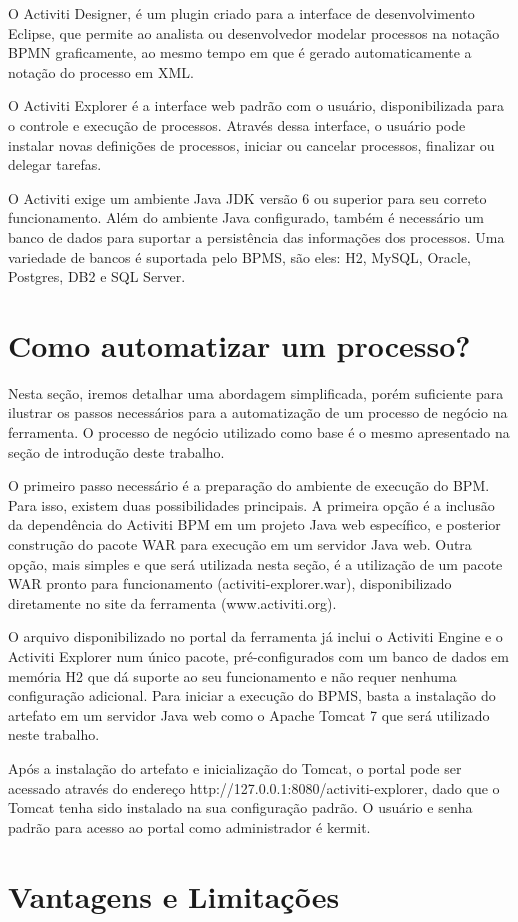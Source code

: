 O Activiti Designer, é um plugin criado para a interface de desenvolvimento Eclipse, que permite ao analista ou desenvolvedor modelar processos na notação BPMN graficamente, ao mesmo tempo em que é gerado automaticamente a notação do processo em XML.

O Activiti Explorer é a interface web padrão com o usuário, disponibilizada para o controle e execução de processos. Através dessa interface, o usuário pode instalar novas definições de processos, iniciar ou cancelar processos, finalizar ou delegar tarefas.

O Activiti exige um ambiente Java JDK versão 6 ou superior para seu correto funcionamento. Além do ambiente Java configurado, também é necessário um banco de dados para suportar a persistência das informações dos processos. Uma variedade de bancos é suportada pelo BPMS, são eles: H2, MySQL, Oracle, Postgres, DB2 e SQL Server.

\section{Como automatizar um processo?}\label{sec:activiti-automatizar_processo}

Nesta seção, iremos detalhar uma abordagem simplificada, porém suficiente para ilustrar os passos necessários para a automatização de um processo de negócio na ferramenta.  O processo de negócio utilizado como base é o mesmo apresentado na seção de introdução deste trabalho.

O primeiro passo necessário é a preparação do ambiente de execução do BPM. Para isso, existem duas possibilidades principais. A primeira opção é a inclusão da dependência do Activiti BPM em um projeto Java web específico, e posterior construção do pacote WAR para execução em um servidor Java web. Outra opção, mais simples e que será utilizada nesta seção, é a utilização de um pacote WAR pronto para funcionamento (activiti-explorer.war), disponibilizado diretamente no site da ferramenta (www.activiti.org).

O arquivo disponibilizado no portal da ferramenta já inclui o Activiti Engine e o Activiti Explorer num único pacote, pré-configurados com um banco de dados em memória H2 que dá suporte ao seu funcionamento e não requer nenhuma configuração adicional. Para iniciar a execução do BPMS, basta a instalação do artefato em um servidor Java web como o Apache Tomcat 7 que será utilizado neste trabalho.

Após a instalação do artefato e inicialização do Tomcat, o portal pode ser acessado através do endereço http://127.0.0.1:8080/activiti-explorer, dado que o Tomcat tenha sido instalado na sua configuração padrão. O usuário e senha padrão para acesso ao portal como administrador é kermit.



\section{Vantagens e Limitações}\label{sec:activiti-vantages_limitacoes}


